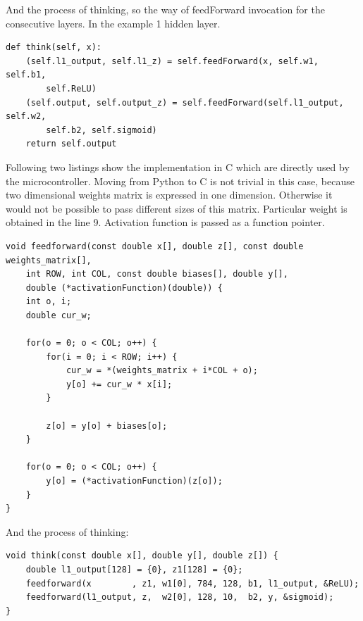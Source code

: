 And the process of thinking, so the way of feedForward invocation for the consecutive layers. In the example 1 hidden layer.
\begin{verbatim}
def think(self, x):
    (self.l1_output, self.l1_z) = self.feedForward(x, self.w1, self.b1, 
        self.ReLU)
    (self.output, self.output_z) = self.feedForward(self.l1_output, self.w2, 
        self.b2, self.sigmoid)
    return self.output
\end{verbatim}
Following two listings show the implementation in C which are directly used by the microcontroller. Moving from Python to C is not trivial in this case, because two dimensional weights matrix is expressed in one dimension. Otherwise it would not be possible to pass different sizes of this matrix. Particular weight is obtained in the line 9. Activation function is passed as a function pointer. 
\begin{verbatim}
void feedforward(const double x[], double z[], const double weights_matrix[], 
    int ROW, int COL, const double biases[], double y[],
    double (*activationFunction)(double)) {
	int o, i;
	double cur_w;

	for(o = 0; o < COL; o++) {
		for(i = 0; i < ROW; i++) {
			cur_w = *(weights_matrix + i*COL + o);
			y[o] += cur_w * x[i];
		}

		z[o] = y[o] + biases[o];
	}

	for(o = 0; o < COL; o++) {
		y[o] = (*activationFunction)(z[o]);
	}
}
\end{verbatim}
And the process of thinking:
\begin{verbatim}
void think(const double x[], double y[], double z[]) {
	double l1_output[128] = {0}, z1[128] = {0};
	feedforward(x        , z1, w1[0], 784, 128, b1, l1_output, &ReLU);
	feedforward(l1_output, z,  w2[0], 128, 10,  b2, y, &sigmoid);
}
\end{verbatim}
